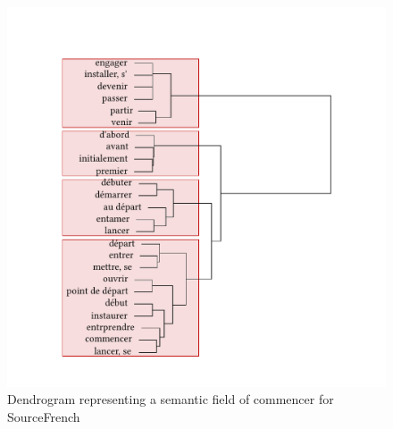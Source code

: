 \begin{figure}
\includegraphics[width=\textwidth]{figures/tree91.pdf}
\caption{\label{fig:4:88}  Dendrogram representing a semantic field of commencer for SourceFrench}
\end{figure}

